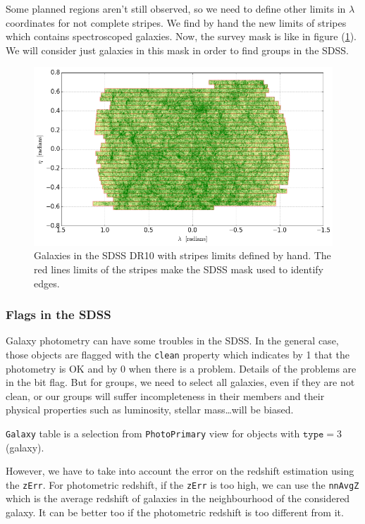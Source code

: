 Some planned regions aren't still observed, so we need to define other
limits in $\lambda$ coordinates for not complete stripes. We find by hand
the new limits of stripes which contains spectroscoped galaxies. Now, the
survey mask is like in figure (\ref{fig:sdss}). We will
consider just galaxies in this mask in order to find groups in the SDSS\@.
%
\begin{figure}[ht]
    \centering
    \includegraphics[width=\linewidth]{figures/sdss/sdss.png}
    \caption{Galaxies in the SDSS DR10 with stripes limits defined by hand.
    The red lines limits of the stripes make the SDSS mask used to identify
edges.\label{fig:sdss}}
\end{figure}
%
\subsubsection{Flags in the SDSS}
%
Galaxy photometry can have some troubles in the SDSS\@. In the general case,
those objects are flagged with the \texttt{clean} property which indicates
by 1 that the photometry is OK and by 0 when there is a problem. Details of
the problems are in the bit flag. But for groups, we need to select all
galaxies, even if they are not clean, or our groups will suffer
incompleteness in their members and their physical properties such as
luminosity, stellar mass\ldots will be biased.

\texttt{Galaxy} table is a selection from \texttt{PhotoPrimary} view for
objects with $\mathrm{\texttt{type}}=3$ (galaxy).

However, we have to take into account the error on the redshift estimation
using the \texttt{zErr}. For photometric redshift, if the \texttt{zErr} is
too high, we can use the \texttt{nnAvgZ} which is the average redshift of
galaxies in the neighbourhood of the considered galaxy. It can be better too
if the photometric redshift is too different from it.


